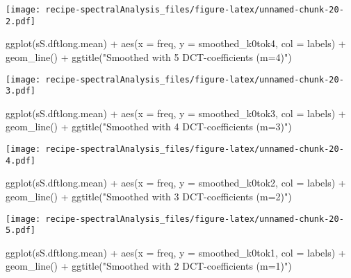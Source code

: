 \documentclass[
]{book}
\newenvironment{Shaded}{\begin{snugshade}}{\end{snugshade}}
\newcommand{\AttributeTok}[1]{\textcolor[rgb]{0.77,0.63,0.00}{#1}}
\newcommand{\FunctionTok}[1]{\textcolor[rgb]{0.00,0.00,0.00}{#1}}
\newcommand{\NormalTok}[1]{#1}
\newcommand{\SpecialCharTok}[1]{\textcolor[rgb]{0.00,0.00,0.00}{#1}}
\newcommand{\StringTok}[1]{\textcolor[rgb]{0.31,0.60,0.02}{#1}}
\begin{document}
\texttt{[image: recipe-spectralAnalysis\_files/figure-latex/unnamed-chunk-20-2.pdf]}

\begin{Shaded}
\begin{Highlighting}[]
\FunctionTok{ggplot}\NormalTok{(sS.dftlong.mean) }\SpecialCharTok{+}
  \FunctionTok{aes}\NormalTok{(}\AttributeTok{x =}\NormalTok{ freq, }\AttributeTok{y =}\NormalTok{ smoothed\_k0tok4, }\AttributeTok{col =}\NormalTok{ labels) }\SpecialCharTok{+}
  \FunctionTok{geom\_line}\NormalTok{() }\SpecialCharTok{+}
  \FunctionTok{ggtitle}\NormalTok{(}\StringTok{"Smoothed with 5 DCT{-}coefficients (m=4)"}\NormalTok{)}
\end{Highlighting}
\end{Shaded}

\texttt{[image: recipe-spectralAnalysis\_files/figure-latex/unnamed-chunk-20-3.pdf]}

\begin{Shaded}
\begin{Highlighting}[]
\FunctionTok{ggplot}\NormalTok{(sS.dftlong.mean) }\SpecialCharTok{+}
  \FunctionTok{aes}\NormalTok{(}\AttributeTok{x =}\NormalTok{ freq, }\AttributeTok{y =}\NormalTok{ smoothed\_k0tok3, }\AttributeTok{col =}\NormalTok{ labels) }\SpecialCharTok{+}
  \FunctionTok{geom\_line}\NormalTok{()  }\SpecialCharTok{+}
  \FunctionTok{ggtitle}\NormalTok{(}\StringTok{"Smoothed with 4 DCT{-}coefficients (m=3)"}\NormalTok{)}
\end{Highlighting}
\end{Shaded}

\texttt{[image: recipe-spectralAnalysis\_files/figure-latex/unnamed-chunk-20-4.pdf]}

\begin{Shaded}
\begin{Highlighting}[]
\FunctionTok{ggplot}\NormalTok{(sS.dftlong.mean) }\SpecialCharTok{+}
  \FunctionTok{aes}\NormalTok{(}\AttributeTok{x =}\NormalTok{ freq, }\AttributeTok{y =}\NormalTok{ smoothed\_k0tok2, }\AttributeTok{col =}\NormalTok{ labels) }\SpecialCharTok{+}
  \FunctionTok{geom\_line}\NormalTok{()  }\SpecialCharTok{+}
  \FunctionTok{ggtitle}\NormalTok{(}\StringTok{"Smoothed with 3 DCT{-}coefficients (m=2)"}\NormalTok{)}
\end{Highlighting}
\end{Shaded}

\texttt{[image: recipe-spectralAnalysis\_files/figure-latex/unnamed-chunk-20-5.pdf]}

\begin{Shaded}
\begin{Highlighting}[]
\FunctionTok{ggplot}\NormalTok{(sS.dftlong.mean) }\SpecialCharTok{+}
  \FunctionTok{aes}\NormalTok{(}\AttributeTok{x =}\NormalTok{ freq, }\AttributeTok{y =}\NormalTok{ smoothed\_k0tok1, }\AttributeTok{col =}\NormalTok{ labels) }\SpecialCharTok{+}
  \FunctionTok{geom\_line}\NormalTok{() }\SpecialCharTok{+}
  \FunctionTok{ggtitle}\NormalTok{(}\StringTok{"Smoothed with 2 DCT{-}coefficients (m=1)"}\NormalTok{)}
\end{Highlighting}
\end{Shaded}
\end{document}
